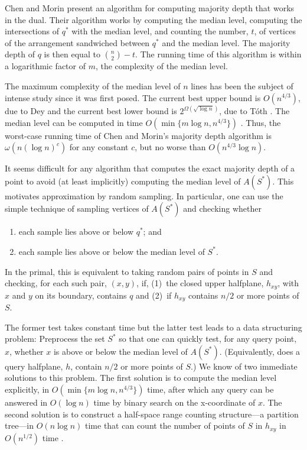 \documentclass{patmorin}
\begin{document}
Chen and Morin \cite{cm11} present an algorithm for computing majority
depth that works in the dual.  Their algorithm works by computing the
median level, computing the intersections of $q^*$ with the median level,
and counting the number, $t$, of vertices of the arrangement sandwiched
between $q^*$ and the median level.  The majority depth of $q$ is then
equal to $\binom{n}{2}-t$.  The running time of this algorithm is within
a logarithmic factor of $m$, the complexity of the median level.

The maximum complexity of the median level of $n$ lines has been the
subject of intense study since it was first posed.  The current best
upper bound is $O(n^{4/3})$, due to Dey \cite{d98} and the current best
lower bound is $2^{\Omega(\sqrt{\log n})}$, due to T\'oth \cite{t00}.
The median level can be computed in time $O(\min\{m\log n,n^{4/3}\})$
\cite{bj02,c99}.  Thus, the worst-case running time of Chen and Morin's
majority depth algorithm is $\omega(n(\log n)^c)$ for any constant $c$,
but no worse than $O(n^{4/3}\log n)$.

It seems difficult for any algorithm that computes the exact majority
depth of a point to avoid (at least implicitly) computing the median
level of $A(S^*)$.  This motivates approximation by random sampling.
In particular, one can use the simple technique of sampling vertices of
$A(S^*)$ and checking whether
\begin{enumerate}
  \item each sample lies above or below $q^*$; and
  \item each sample lies above or below the median level of $S^*$.
\end{enumerate}
In the primal, this is equivalent to taking random pairs of points in
$S$ and checking, for each such pair, $(x,y)$, if, (1)~the closed
upper halfplane, $h_{xy}$, with $x$ and $y$ on its boundary, contains $q$
and (2)~if $h_{xy}$ contains
 $n/2$ or more points of $S$.

The former test takes constant time but the latter test leads to a
data structuring problem:  Preprocess the set $S^*$ so that one can
quickly test, for any query point, $x$, whether $x$ is above or below
the median level of $A(S^*)$.  (Equivalently, does a query halfplane, $h$,
contain $n/2$ or more points of $S$.)  We know of two immediate solutions
to this problem.  The first solution is to compute the median level
explicitly, in $O(\min\{m\log n,n^{4/3}\})$ time, after which any query
can be answered in $O(\log n)$ time by binary search on the x-coordinate
of $x$.  The second solution is to construct a half-space range counting
structure---a partition tree---in $O(n\log n)$ time that can count the
number of points of $S$ in $h_{xy}$ in $O(n^{1/2})$ time \cite{c12}.
\end{document}

